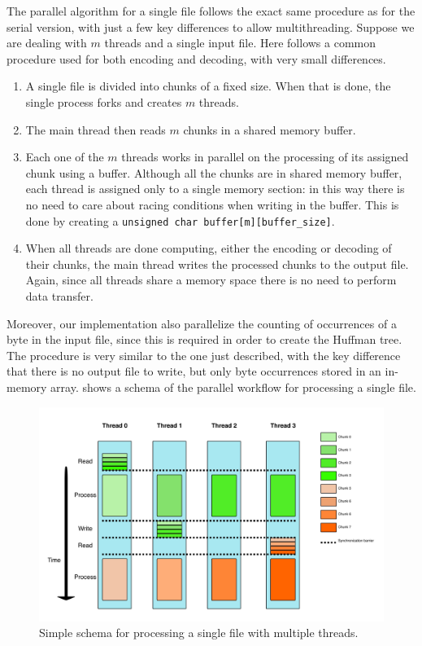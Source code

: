 The parallel algorithm for a single file follows the exact same procedure as for the serial version, with just a few key differences to allow multithreading. Suppose we are dealing with \(m\) threads and a single input file. Here follows a common procedure used for both encoding and decoding, with very small differences. 
\begin{enumerate}
	\item A single file is divided into chunks of a fixed size. When that is done, the single process forks and creates \(m\) threads.
	\item The main thread then reads \(m\) chunks in a shared memory buffer.
	\item Each one of the \(m\) threads works in parallel on the processing of its assigned chunk using a buffer. Although all the chunks are in shared memory buffer, each thread is assigned only to a single memory section: in this way there is no need to care about racing conditions when writing in the buffer. This is done by creating a \verb|unsigned char buffer[m][buffer_size]|. 
	\item When all threads are done computing, either the encoding or decoding of their chunks, the main thread writes the processed chunks to the output file.
	Again, since all threads share a memory space there is no need to perform data transfer.
\end{enumerate}

Moreover, our implementation also parallelize the counting of occurrences of a byte in the input file, since this is required in order to create the Huffman tree. The procedure is very similar to the one just described, with the key difference that there is no output file to write, but only byte occurrences stored in an in-memory array.  shows a schema of the parallel workflow for processing a single file. 

\begin{figure}
	\centering
	\includegraphics[width=0.8\linewidth]{../imgs/threading}
	\caption{Simple schema for processing a single file with multiple threads.}
	\label{fig:threading}
\end{figure}


